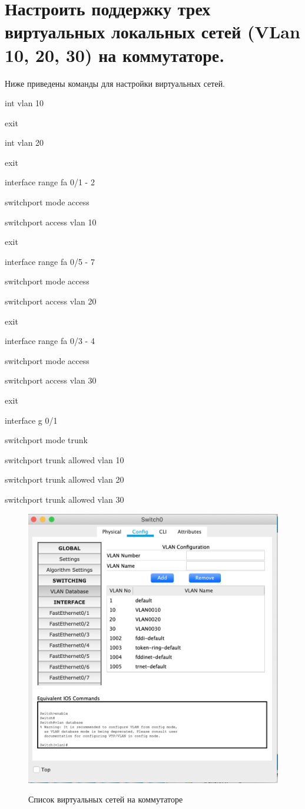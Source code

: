\documentclass[a4paper,12pt]{article}
\begin{document}
	\section{Настроить поддержку трех виртуальных локальных сетей (VLan 10, 20, 30) на коммутаторе.}
	
	Ниже приведены команды для настройки виртуальных сетей.
	
	int vlan 10
	
	exit
	
	int vlan 20
	
	exit
	
	interface range fa 0/1 - 2
	
	switchport mode access
	
	switchport access vlan 10
	
	exit
	
	interface range fa 0/5 - 7
	
	switchport mode access
	
	switchport access vlan 20
	
	exit
	
	interface range fa 0/3 - 4
	
	switchport mode access
	
	switchport access vlan 30
	
	exit
	
	interface g 0/1
	
	switchport mode trunk
	
	switchport trunk allowed vlan 10
	
	switchport trunk allowed vlan 20
	
	switchport trunk allowed vlan 30

	\begin{figure}[h!]
		\begin{center}
			{\includegraphics[scale = 0.6]{img/2.png}}
			\caption{ Список виртуальных сетей на коммутаторе}
			\label{ris:2}
		\end{center}
	\end{figure}
\end{document}
